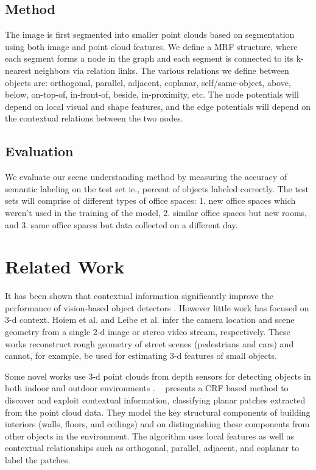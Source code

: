 \documentclass[11pt]{article} %
\begin{document}
   \subsection{Method}
     The image is first segmented into smaller point clouds based on segmentation using both image and point cloud features. We define a
     MRF structure, where each segment forms a node in the graph and each segment is connected to its k-nearest neighbors via relation links.
     The various relations we define between objects are: orthogonal, parallel, adjacent, coplanar, self/same-object, above, below, on-top-of, 
     in-front-of, beside, in-proximity, etc. The node potentials will depend on local visual and shape features, and the edge potentials will depend 
     on the contextual relations between the two nodes.

      
   \subsection{Evaluation}
     We evaluate our scene understanding method by measuring the accuracy of semantic labeling on the test set ie., percent of objects labeled 
     correctly. The test sets will comprise of different types of office spaces: 1. new office spaces which weren't used in the training of the model, 
     2. similar office spaces but new rooms, and 
     3. same office spaces but data collected on a different day. 
   

 \section{Related Work}
 
 
    It has been shown that contextual information significantly improve the performance of vision-based 
   object detectors \cite{Torralba:exploting_context, Hoiem:puttingobjects,Torralba:contextualmodels}. However 
   little work has focused on 3-d context. Hoiem et al. \cite{Hoiem:puttingobjects} and Leibe et al. \cite{Leibe07:dynamic} 
  infer the camera location and scene geometry from a single 2-d image or stereo video stream, respectively. 
  These works reconstruct rough geometry of street scenes (pedestrians and cars) and cannot, for example, 
  be used for estimating 3-d features of small objects.
  
    Some novel works use 3-d point clouds from depth sensors for detecting objects in both indoor and outdoor environments 
    \cite {xiong:indoor,Rusu:ObjectMaps , xiong:3DSceneAnalysis, Golovinskiy:shape-basedrecognition, Shapovalov2010}. 
   ~\cite{xiong:indoor} presents a CRF based method to discover and exploit contextual information, classifying planar patches 
   extracted from the point cloud data. They model the key structural components of building interiors (walls, floors, and ceilings) 
   and on distinguishing these components from other objects in the environment. The algorithm uses local features as well as 
   contextual relationships such as orthogonal, parallel, adjacent, and coplanar to label the patches.
  
\end{document}
